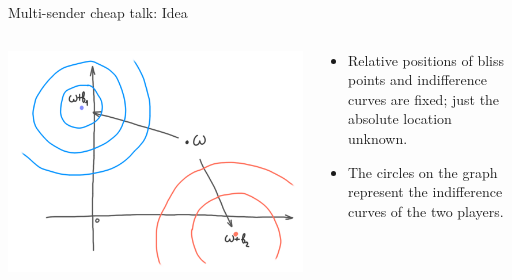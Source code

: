 \documentclass[english,10pt
,aspectratio=169
]{beamer}
\begin{document}
\begin{frame}{Multi-sender cheap talk: Idea}
	\begin{columns}
		\begin{column}{0.5\textwidth}
			\begin{center}
				\includegraphics[scale=0.65]{pics/M4/battaglini01.png}
			\end{center}
		\end{column}
		\begin{column}{0.5\textwidth}
			{\small
				\begin{itemize}
					\item Relative positions of bliss points and indifference curves are fixed; just the absolute location unknown.
					\item The circles on the graph represent the indifference curves of the two players.
				\end{itemize}
			}
		\end{column}
	\end{columns}
\end{frame}
\end{document}
